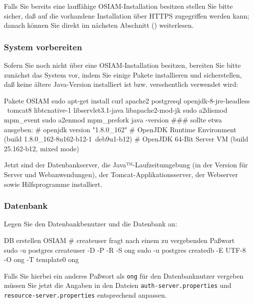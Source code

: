 \documentclass{tarentanleitung}
\begin{document}
Falls Sie bereits eine lauffähige OSIAM-Installation besitzen stellen
Sie bitte sicher, daß auf die vorhandene Installation über HTTPS
zugegriffen werden kann; danach können Sie direkt im nächsten Abschnitt
() weiterlesen.

\subsubsection{System vorbereiten}\label{subsubsec:setup-osiam-prepare}

\begin{minipage}{\linewidth}
Sofern Sie noch nicht über eine OSIAM-Installation besitzen, bereiten
Sie bitte zunächst das System vor, indem Sie einige Pakete installieren
und sicherstellen, daß keine ältere Java-Version installiert ist bzw.
versehentlich verwendet wird:

\begin{lstdump}{Pakete OSIAM}
sudo apt-get install curl apache2 postgresql openjdk-8-jre-headless \
    tomcat8 libtcnative-1 libservlet3.1-java libapache2-mod-jk
sudo a2dismod mpm_event
sudo a2enmod mpm_prefork
java -version
### sollte etwa ausgeben:
# openjdk version "1.8.0_162"
# OpenJDK Runtime Environment (build 1.8.0_162-8u162-b12-1~deb9u1-b12)
# OpenJDK 64-Bit Server VM (build 25.162-b12, mixed mode)
\end{lstdump}
\end{minipage}

Jetzt sind der Datenbankserver, die Java™-Laufzeitumgebung (in der
Version für Server und Webanwendungen), der Tomcat-Applikationsserver,
der Webserver sowie Hilfsprogramme installiert.

\subsubsection{Datenbank}\label{subsubsec:setup-osiam-db}

\begin{minipage}{\linewidth}
Legen Sie den Datenbankbenutzer und die Datenbank an:

\begin{lstdump}{DB erstellen OSIAM}
# createuser fragt nach einem zu vergebenden Paßwort
sudo -u postgres createuser -D -P -R -S ong
sudo -u postgres createdb -E UTF-8 -O ong -T template0 ong
\end{lstdump}

Falls Sie hierbei ein anderes Paßwort als \texttt{ong} für
den Datenbanknutzer vergeben müssen Sie jetzt die Angaben
in den Dateien \texttt{auth-server.properties} und
\texttt{resource-server.properties} entsprechend anpassen.
\end{minipage}
\end{document}

